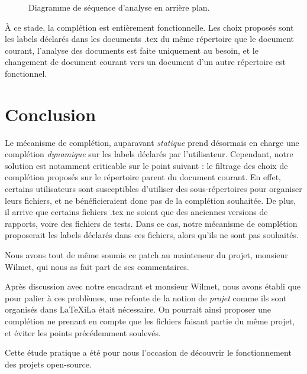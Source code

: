 \documentclass[a4paper,11pt]{report}
\begin{document}
\begin{figure}[h]
\label{fig:multiple_doc_completion}
\centering

\caption{Diagramme de séquence d'analyse en arrière plan.}
\end{figure}

À ce stade, la complétion est entièrement fonctionnelle.
Les choix proposés sont les labels déclarés dans les documents .tex du même répertoire que le document courant, l'analyse des documents est faite uniquement au besoin, et le changement de document courant vers un document d'un autre répertoire est fonctionnel.

\chapter{Conclusion}
Le mécanisme de complétion, auparavant \textit{statique} prend désormais en charge une complétion \textit{dynamique} sur les labels déclarés par l'utilisateur.
Cependant, notre solution est notamment criticable sur le point suivant : le filtrage des choix de complétion proposés sur le répertoire parent du document courant.
En effet, certains utilisateurs sont susceptibles d'utiliser des sous-répertoires pour organiser leurs fichiers, et ne bénéficieraient donc pas de la complétion souhaitée.
De plus, il arrive que certains fichiers .tex ne soient que des anciennes versions de rapports, voire des fichiers de tests. Dans ce cas, notre mécanisme de complétion proposerait les labels déclarés dans ces fichiers, alors qu'ils ne sont pas souhaités.

Nous avons tout de même soumis ce patch au mainteneur du projet, monsieur Wilmet, qui nous as fait part de ses commentaires.

Après discussion avec notre encadrant et monsieur Wilmet, nous avons établi que pour palier à ces problèmes, une refonte de la notion de \textit{projet} comme ils sont organisés dans LaTeXiLa était nécessaire.
On pourrait ainsi proposer une complétion ne prenant en compte que les fichiers faisant partie du même projet, et éviter les points précédemment soulevés.

Cette étude pratique a été pour nous l'occasion de découvrir le fonctionnement des projets open-source.
\end{document}
